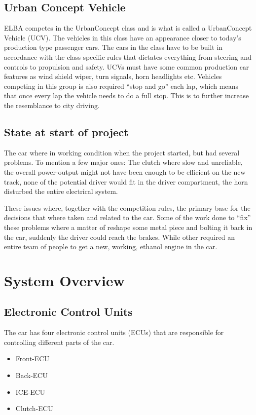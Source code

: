 \subsection{Urban Concept Vehicle}\label{UCV}
ELBA competes in the UrbanConcept class and is what is called a UrbanConcept
Vehicle (UCV). The vehicles in this class have an appearance closer to today's
production type passenger cars. The cars in the class have to be built in
accordance with the class specific rules that dictates everything from steering
and controls to propulsion and safety. UCVs must have some common production
car features as wind shield wiper, turn signals, horn headlights etc. Vehicles
competing in this group is also required ``stop and go'' each lap, which means
that once every lap the vehicle needs to do a full stop. This is to further
increase the resemblance to city driving.

\subsection{State at start of project}
The car where in working condition when the project started, but had several
problems. To mention a few major ones: The clutch where slow and unreliable,
the overall power-output might not have been enough to be efficient on the new
track, none of the potential driver would fit in the driver compartment, the
horn disturbed the entire electrical system.

These issues where, together with the competition rules, the primary base for
the decisions that where taken and related to the car. Some of the work done to
``fix'' these problems where a matter of reshape some metal piece and bolting it
back in the car, suddenly the driver could reach the brakes. While other
required an entire team of people to get a new, working, ethanol engine in the
car.

\section{System Overview}
\subsection{Electronic Control Units}
The car has four electronic control units (ECUs) that are responsible for
controlling different parts of the car.

\begin{itemize}
\item Front-ECU
\item Back-ECU
\item ICE-ECU
\item Clutch-ECU
\end{itemize}

